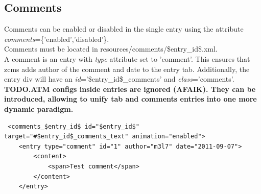 \documentclass[a4paper,12pt]{article}
\begin{document}
\subsection{Comments}
Comments can be enabled or disabled in the single entry using the attribute \emph{comments}=\{'enabled','disabled'\}.\\
Comments must be located in resources/comments/\$entry\_id\$.xml.\\
A comment is an entry with \emph{type} attribute set to 'comment'. This ensures that zcms adds author of the comment and date to the entry tab.
Additionally, the entry div will have an \emph{id}='\$entry\_id\$\_comments' and \emph{class}='comments'.\\[0.2cm]
\bfseries{TODO}.\normalfont ATM configs inside entries are ignored (AFAIK). They can be introduced, allowing to unify tab and comments entries into one more dynamic paradigm.
\footnotesize
\lstset{language=XML}
\begin{lstlisting}
 <comments_$entry_id$ id="$entry_id$" target="#$entry_id$_comments_text" animation="enabled">
	<entry type="comment" id="1" author="m3l7" date="2011-09-07">
		<content>
			<span>Test comment</span>
		</content>
	</entry>
\end{lstlisting}
\end{document}
